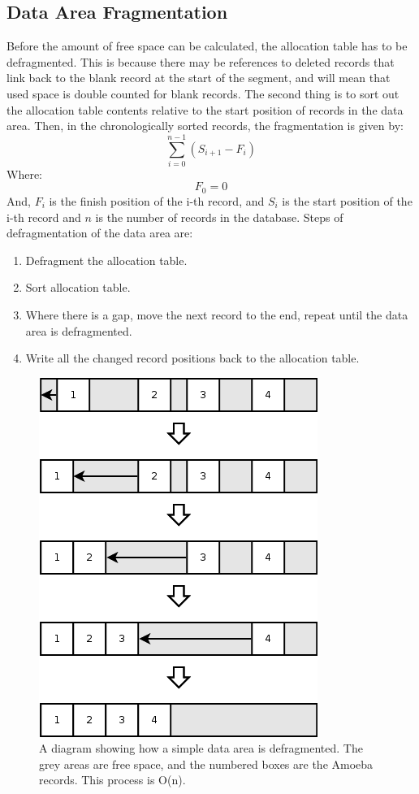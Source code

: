 \documentclass[11pt]{article}
\begin{document}
\subsection{Data Area Fragmentation}
Before the amount of free space can be calculated, the allocation table has to be defragmented. This is because there may be references to deleted records that link back to the blank record at the start of the segment, and will mean that used space is double counted for blank records. The second thing is to sort out the allocation table contents relative to the start position of records in the data area. Then, in the chronologically sorted records, the fragmentation is given by:
$$
\sum_{i=0}^{n-1}{(S_{i+1}-F_{i})}
$$
Where:
$$
F_{0}=0
$$
And, $F_{i}$ is the finish position of the i-th record, and $S_{i}$ is the start position of the i-th record and $n$ is the number of records in the database.
\newline
\newline
Steps of defragmentation of the data area are:
\begin{enumerate}
\item Defragment the allocation table.
\item Sort allocation table.
\item Where there is a gap, move the next record to the end, repeat until the data area is defragmented.
\item Write all the changed record positions back to the allocation table.
\end{enumerate}
\newpage
\noindent
\begin{figure}[ht]
\centering
\includegraphics[scale=0.5]{Fragmentation3.png}
\caption{A diagram showing how a simple data area is defragmented. The grey areas are free space, and the numbered boxes are the Amoeba records. This process is O(n).}
\end{figure}
\end{document}
